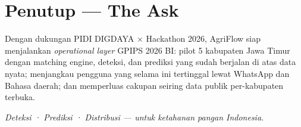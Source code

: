 \documentclass[11pt,a4paper]{article}
\begin{document}
\section{Penutup --- The Ask}
Dengan dukungan PIDI DIGDAYA $\times$ Hackathon 2026, AgriFlow siap menjalankan \emph{operational
layer} GPIPS 2026 BI: pilot 5 kabupaten Jawa Timur dengan matching engine, deteksi, dan prediksi
yang sudah berjalan di atas data nyata; menjangkau pengguna yang selama ini tertinggal lewat
WhatsApp dan Bahasa daerah; dan memperluas cakupan seiring data publik per-kabupaten terbuka.

\begin{center}
\emph{Deteksi · Prediksi · Distribusi --- untuk ketahanan pangan Indonesia.}
\end{center}
\end{document}
